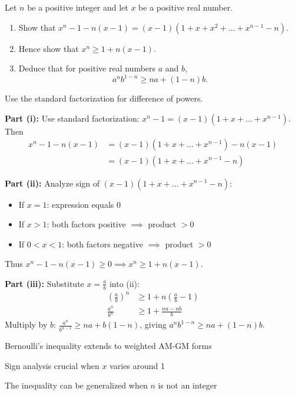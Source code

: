 \begin{problem}
Let $n$ be a positive integer and let $x$ be a positive real number.
\begin{enumerate}
    \item[(i)] Show that $x^n - 1 - n(x-1) = (x-1)(1+x+x^2+\dots+x^{n-1}-n)$.
    \item[(ii)] Hence show that $x^n \ge 1 + n(x-1)$.
    \item[(iii)] Deduce that for positive real numbers $a$ and $b$,
    \[ a^n b^{1-n} \ge na + (1-n)b. \]
\end{enumerate}
\end{problem}

\begin{hint}
Use the standard factorization for difference of powers.
\end{hint}

\begin{solution}
\textbf{Part (i):} Use standard factorization: $x^n - 1 = (x-1)(1 + x + \dots + x^{n-1})$. Then
\begin{align*}
x^n - 1 - n(x-1) &= (x-1)(1 + x + \dots + x^{n-1}) - n(x-1)\\
&= (x-1)(1 + x + \dots + x^{n-1} - n)
\end{align*}

\textbf{Part (ii):} Analyze sign of $(x-1)(1+x+\dots+x^{n-1}-n)$:
\begin{itemize}
\item If $x=1$: expression equals 0
\item If $x>1$: both factors positive $\implies$ product $> 0$
\item If $0<x<1$: both factors negative $\implies$ product $> 0$
\end{itemize}
Thus $x^n - 1 - n(x-1) \ge 0 \implies x^n \ge 1 + n(x-1)$.

\textbf{Part (iii):} Substitute $x = \frac{a}{b}$ into (ii):
\begin{align*}
\left(\frac{a}{b}\right)^n &\ge 1 + n\left(\frac{a}{b} - 1\right)\\
\frac{a^n}{b^n} &\ge 1 + \frac{na - nb}{b}
\end{align*}
Multiply by $b$: $\frac{a^n}{b^{n-1}} \ge na + b(1-n)$, giving $a^n b^{1-n} \ge na + (1-n)b$.
\end{solution}

\begin{takeaways}
\item Bernoulli's inequality extends to weighted AM-GM forms
\item Sign analysis crucial when $x$ varies around 1
\item The inequality can be generalized when $n$ is not an integer 
\end{takeaways}
